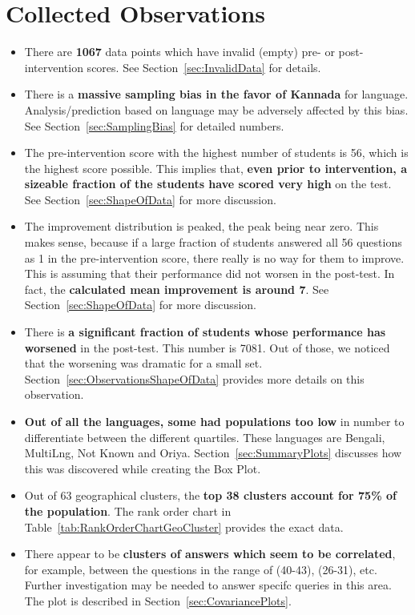 \documentclass[10pt]{article}
\begin{document}
\section{Collected Observations}
\label{sec:CollectedObservations}
\begin{itemize}
\item There are \textbf{1067} data points which have invalid (empty) pre- or post-intervention scores. See Section~\ref{sec:InvalidData} for details.
\item There is a \textbf{massive sampling bias in the favor of Kannada} for language. Analysis/prediction based on language may be adversely affected by this bias. See Section~\ref{sec:SamplingBias} for detailed numbers.
\item The pre-intervention score with the highest number of students is 56, which is the highest score possible. This implies that, \textbf{even prior to intervention, a sizeable fraction of the students have scored very high} on the test. See Section~\ref{sec:ShapeOfData} for more discussion.
\item The improvement distribution is peaked, the peak being near zero. This makes sense, because if a large fraction of students answered all 56 questions as 1 in the pre-intervention score, there really is no way for them to improve. This is assuming that their performance did not worsen in the post-test. In fact, the \textbf{calculated mean improvement is around 7}. See Section~\ref{sec:ShapeOfData} for more discussion.
\item There is \textbf{a significant fraction of students whose performance has worsened} in the post-test. This number is 7081. Out of those, we noticed that the worsening was dramatic for a small set. Section~\ref{sec:ObservationsShapeOfData} provides more details on this observation.
\item \textbf{Out of all the languages, some had populations too low} in number to differentiate between the different quartiles. These languages are Bengali, MultiLng, Not Known and Oriya. Section~\ref{sec:SummaryPlots} discusses how this was discovered while creating the Box Plot.
\item Out of 63 geographical clusters, the \textbf{top 38 clusters account for 75\% of the population}. The rank order chart in Table~\ref{tab:RankOrderChartGeoCluster} provides the exact data.
\item There appear to be \textbf{clusters of answers which seem to be correlated}, for example, between the questions in the range of (40-43), (26-31), etc. Further investigation may be needed to answer specifc queries in this area. The plot is described in Section~\ref{sec:CovariancePlots}.

\end{itemize}
\end{document}
